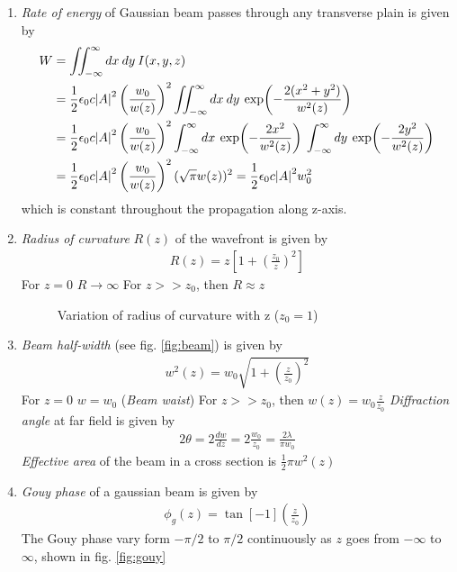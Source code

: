 \documentclass[11pt,a4paper]{article}
\numberwithin{equation}{section}
\begin{document}
\begin{enumerate}
	\item
	\textit{Rate of energy} of Gaussian beam passes through any transverse plain is given by
	\begin{align}
		W&= \iint_{-\infty}^{\infty} dx\:dy\:I(x,y,z)\nonumber\\
		&= \frac{1}{2} \epsilon_0c \abs{A}^2 \left(\frac{w_0}{w(z)}\right)^2 \iint_{-\infty}^{\infty} dx\:dy\: \exp(-\frac{2(x^2+y^2)}{w^2(z)}\nonumber)\\
		&= \frac{1}{2} \epsilon_0c \abs{A}^2 \left(\frac{w_0}{w(z)}\right)^2 \int_{-\infty}^{\infty} dx\: \exp(-\frac{2x^2}{w^2(z)})\: \int_{-\infty}^{\infty} dy\: \exp(-\frac{2y^2}{w^2(z)})\nonumber\\
		&=  \frac{1}{2}\epsilon_0c \abs{A}^2 \left(\frac{w_0}{w(z)}\right)^2 (\sqrt{\pi} w(z))^2 = \frac{1}{2}\epsilon_0c \abs{A}^2 w_0^2
	\end{align} which is constant throughout the propagation along z-axis.

	\item
	\textit{Radius of curvature} $R(z)$ of the wavefront is given by
	\begin{align}
		R(z)= z\left[1+\left(\frac{z_0}{z}\right)^2\right]
	\end{align}
	\subitem For $z=0$ $R\rightarrow\infty$
	\subitem For $z>>z_0$, then $R\approx z$
	
	\begin{figure}[H]
	\centering
	\scalebox{0.7}{}
	\caption{Variation of radius of curvature with z ($z_0=1$)}
	\label{fig:R vs z}
	\end{figure}
	
	\item
	\textit{Beam half-width} (see fig. \ref{fig:beam}) is given by 
	\begin{align}
		w^2(z)= w_0\sqrt{1+\left(\frac{z}{z_0}\right)^2}
	\end{align}
	\subitem For $z=0$ $w = w_0$ (\textit{Beam waist})
	\subitem For $z>>z_0$, then $w(z)= w_0\frac{z}{z_0}$
	\subitem \textit{Diffraction angle} at far field is given by 
	\begin{align}
		2\theta = 2\frac{dw}{dz} = 2\frac{w_0}{z_0} = \frac{2\lambda}{\pi w_0}
	\end{align}
	\subitem \textit{Effective area} of the beam in a cross section is $\displaystyle \frac{1}{2} \pi w^2(z)$
	
	\item 
	\textit{Gouy phase} of a gaussian beam is given by
	\begin{align}
		\phi_g (z) = \tan[-1](\frac{z}{z_0})
	\end{align}
	The Gouy phase vary form $-\pi/2$ to $\pi/2$ continuously as $z$ goes from $-\infty$ to $\infty$, shown in fig. \ref{fig:gouy}
	

\end{enumerate}
\end{document}
